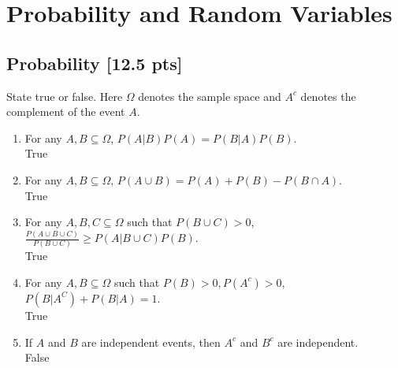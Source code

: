 \documentclass[a4paper]{article}
\theoremstyle{definition}
\newenvironment{soln}{
	\leavevmode\color{blue}\ignorespaces
}{}
\begin{document}
	
	
	
	
	\section{Probability and Random Variables }
	\subsection{Probability [12.5 pts]}
	State true or false. Here $\Omega$ denotes the sample space and $A^c$ denotes the complement of the event $A$.
	\begin{enumerate}
		\item For any $A, B \subseteq \Omega$, $P(A|B)P(A) = P(B|A)P(B)$.\\
		\begin{soln}  True \end{soln}
		
		\item For any $A, B \subseteq \Omega$, $P(A \cup B) = P(A) + P(B) - P(B \cap A)$.\\         
		\begin{soln}  True \end{soln}
		
		\item For any $A, B, C \subseteq \Omega$ such that $P(B \cup C) > 0$,
		$\frac{P(A \cup B \cup C)}{P(B \cup C)} \geq P(A | B \cup C) P(B)$.\\ 
		\begin{soln}  True \end{soln}
		
		\item For any $A, B\subseteq\Omega$ such that $P(B) > 0, P(A^c) > 0$,
		$P(B|A^C) + P(B|A) = 1$.\\ 
		\begin{soln}  True \end{soln}
		
		\item If $A$ and $B$ are independent events, then $A^{c}$ and $B^{c}$ are independent.\\
		\begin{soln}  False \end{soln}
		
	\end{enumerate}
	
\end{document}
